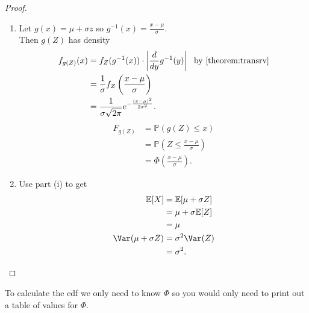 \begin{proof} ~
    \begin{enumerate}
        \item Let $g(x) = \mu + \sigma z$ so $g^{-1}(x) = \frac{x - \mu}{\sigma}$. \\
        Then $g(Z)$ has density 
        \begin{align*}
            f_{g(Z)}(x) &= f_Z(g^{-1}(x)) \cdot \left|\frac{d}{dy}g^{-1}(y)\right| \ \text{ by \Cref{theorem:transrv}} \\
            &= \frac{1}{\sigma} f_Z \left( \frac{x - \mu}{\sigma} \right) \\
            &= \frac{1}{\sigma \sqrt{2 \pi}} e^{- \frac{(x - \mu)^2}{2 \sigma^2}}.
        \end{align*}
        \mathitem \begin{align*}
            F_{g(Z)} &= \mathbb{P}(g(Z) \leq x) \\
            &= \mathbb{P}\left( Z \leq \frac{x - \mu}{\sigma} \right) \\
            &= \Phi \left( \frac{x - \mu}{\sigma} \right).
        \end{align*} 
        \item Use part (i) to get
        \begin{align*}
            \mathbb{E}[X] &= \mathbb{E}[\mu + \sigma Z] \\
            &= \mu + \sigma \mathbb{E}[Z] \\
            &= \mu \\
            \Var(\mu + \sigma Z) &= \sigma^2 \Var(Z) \\
            &= \sigma^2.
        \end{align*} 
    \end{enumerate} 
\end{proof} 

\begin{remark}
    To calculate the cdf we only need to know $\Phi$ so you would only need to print out a table of values for $\Phi$.
\end{remark} 

